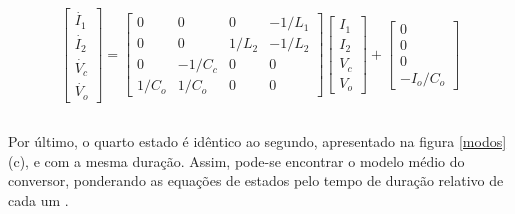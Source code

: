 \documentclass[
        12pt,
        openany, %
        oneside, %
        a4paper,			
        english,			
        brazil
        ]{abntbibufjf}
\begin{document}
\begin{equation}
\begin{array}{cc}
\begin{bmatrix}\dot{I_1} \\\dot{I_2} \\\dot{V_c} \\\dot{V_o}\end{bmatrix}=\begin{bmatrix}0&0&0&-1/L_1 \\ 0&0&1/L_2&-1/L_2 \\ 0&-1/C_c&0&0 \\ 1/C_o&1/C_o&0&0\end{bmatrix}\begin{bmatrix}I_1 \\I_2 \\V_c \\V_o
\end{bmatrix}+\begin{bmatrix}0\\0\\0\\-I_o/C_o\end{bmatrix}\\\\
\end{array}
\end{equation}

Por último, o quarto estado é idêntico ao segundo, apresentado na figura \ref{modos} (c), e com a mesma duração. Assim, pode-se encontrar o modelo médio do conversor, ponderando as equações de estados pelo tempo de duração relativo de cada um \cite{ogata}.
\end{document}
